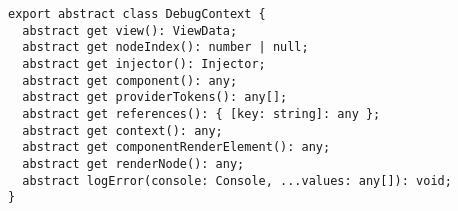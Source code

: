 \begin{verbatim}
export abstract class DebugContext {
  abstract get view(): ViewData;
  abstract get nodeIndex(): number | null;
  abstract get injector(): Injector;
  abstract get component(): any;
  abstract get providerTokens(): any[];
  abstract get references(): { [key: string]: any };
  abstract get context(): any;
  abstract get componentRenderElement(): any;
  abstract get renderNode(): any;
  abstract logError(console: Console, ...values: any[]): void;
}
\end{verbatim}
